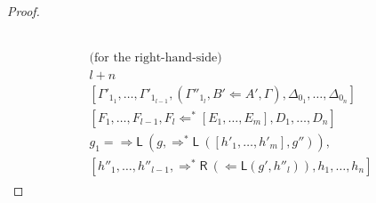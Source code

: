 \documentclass[a4paper,UKenglish,cleveref,autoref,thm-restate, anonymous]{lipics-v2021}
\newcommand{\Larr}{\Leftarrow}
\newcommand{\Ls}{\Leftarrow^*}
\newcommand{\Rarr}{\Rightarrow}
\newcommand{\Rs}{\Rightarrow^*}
\newcommand{\mf}[1]{\mathsf{#1}}
\newcommand{\GG}{\Gamma}
\newcommand{\GD}{\Delta}
\newcommand{\Ll}{{\Larr}\mathsf{L}}
\newcommand{\Lsl}{{\Ls}\mathsf{L}}
\newcommand{\Lsr}{{\Ls}\mathsf{R}}
\newcommand{\Rl}{{\Rarr}\mathsf{L}}
\newcommand{\Rsl}{{\Rs}\mathsf{L}}
\newcommand{\Rsr}{{\Rs}\mathsf{R}}
\begin{document}
\begin{proof}
\[\begin{array}{c}
\begin{array}{c}
     \end{array}
     \\ \\
     \begin{array}{c}
       \text{(for the right-hand-side)} \\
       l+n
       \\
           {[\GG'_{1_1}, \dots, \GG'_{1_{l-1}}, (\GG''_{1_l} , B'\Larr A',\GG),\GD_{0_1},\dots,\GD_{0_n}]}
           \\
             {[F_1, \dots, F_{l-1}, F_l \Ls [E_1,\dots,E_m] , D_1, \dots, D_n]}
           \\
           g_1 = \Rl \ (g, \Rsl \ ([h'_1,\dots,h'_m] , g'')),
           \\
             {[h''_1, \dots, h''_{l-1}, \Rsr \ (\Ll (g' , h''_l)) , h_1, \dots, h_n]}
     \end{array}
\end{array}
\]

\end{proof}
\end{document}
